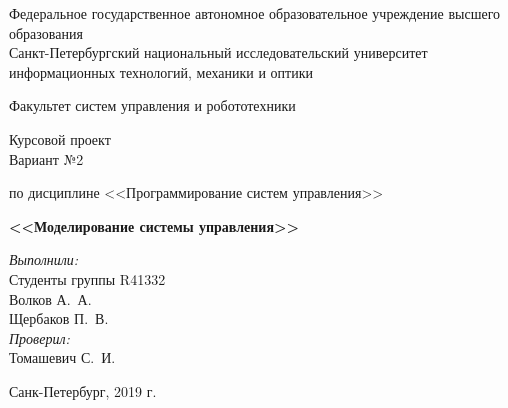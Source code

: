 \begin{titlepage}
\begin{center}


{\normalsize 
Федеральное государственное автономное образовательное учреждение высшего образования 
\\Санкт-Петербургский национальный исследовательский университет 
\\информационных технологий, механики и оптики}

\vspace{1.5cm}

\vspace{0.5cm}
\large Факультет систем управления и робототехники
\vspace{2cm}

\large Курсовой проект
\\ Вариант №2

по дисциплине <<Программирование систем управления>>

{ \large \bfseries <<Моделирование системы управления>>\\[0.4cm] }

\noindent

\begin{flushright} \normalsize
\emph{Выполнили:}\\
Студенты группы R41332\\
Волков \textsc{А.~А.}\\
Щербаков \textsc{П.~В.}\\

\emph{Проверил:} \\
Томашевич \textsc{С.~И.}
\end{flushright}

\vfill

{\normalsize Санк-Петербург, 2019 г.}

\end{center}
\end{titlepage}
